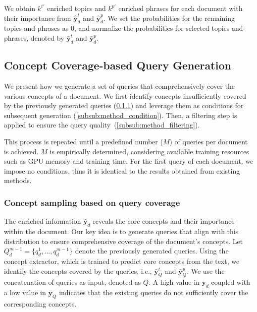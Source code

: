 
We obtain $k^{t'}$ enriched topics and $k^{p'}$ enriched phrases for each document with their importance from $\hat{\mathbf{y}}^{t}_{d}$ and $\hat{\mathbf{y}}^{p}_{d}$.
We set the probabilities for the remaining topics and phrases as $0$, and normalize the probabilities for selected topics and phrases, denoted by $\bar{\textbf{y}}^t_d$ and $\bar{\textbf{y}}^p_d$.



\subsection{Concept Coverage-based Query Generation}
\label{subsec:method_b}
We present how we generate a set of queries that comprehensively cover the various concepts of a document.
We first identify concepts insufficiently covered by the previously generated queries (\cref{subsub:method_sampling}) and leverage them as conditions for subsequent generation (\cref{subsub:method_condition}).
Then, a filtering step is applied to ensure the query quality~(\cref{subsub:method_filtering}).

This process is repeated until a predefined number ($M$) of queries per document is achieved.
$M$ is empirically determined, considering available training resources such as GPU memory and training time.
For the first query of each document, we impose no conditions, thus it is identical to the results obtained from existing methods.


% 
\subsubsection{\textbf{Concept sampling based on query coverage}}
\label{subsub:method_sampling}
The enriched information $\bar{\textbf{y}}_d$ reveals the core concepts and their importance within the document.
Our key idea is to generate queries that align with this distribution to ensure comprehensive coverage of the document's concepts.
Let $Q^{m-1}_d = \{q^1_d, ..., q^{m-1}_d\}$ denote the previously generated queries.
Using the concept extractor, which is trained to predict core concepts from the text, we identify the concepts covered by the queries, i.e., $\bar{\textbf{y}}^t_Q$ and $\bar{\textbf{y}}^p_Q$.
We use the concatenation of queries as input, denoted as $Q$.
A high value in $\bar{\textbf{y}}_d$ coupled with a low value in $\bar{\textbf{y}}_Q$ indicates that the existing queries do not sufficiently cover the corresponding concepts.


